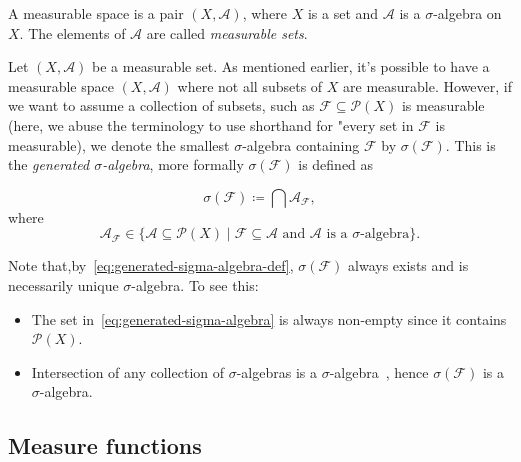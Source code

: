 \begin{definition}
    A measurable space is a pair $(X, \mathcal{A})$, where $X$ is a set and $\mathcal{A}$ is a $\sigma$-algebra on $X$. The elements of $\mathcal{A}$ are called \emph{measurable sets}.
\end{definition}

Let $(X, \mathcal{A})$ be a measurable set. As mentioned earlier, it's possible to have a measurable space $(X, \mathcal{A})$ where not all subsets of $X$ are measurable. However, if we want to assume a collection of subsets, such as $\mathcal{F} \subseteq \mathcal{P}(X)$ is measurable (here, we abuse the terminology to use shorthand for "every set in $\mathcal{F}$ is measurable), we denote the smallest $\sigma$-algebra containing $\mathcal{F}$ by $\sigma(\mathcal{F}) $. This is the \emph{generated $\sigma$-algebra}, more formally $\sigma(\mathcal{F})$ is defined as

\begin{equation}
    \sigma(\mathcal{F}) \coloneq \bigcap \mathcal{A}_\mathcal{F},\label{eq:generated-sigma-algebra-def}
\end{equation}
where
\begin{equation}
    \mathcal{A}_{\mathcal{F}}
    \in \{\mathcal{A} \subseteq  \mathcal{P}(X) \mid \mathcal{F} \subseteq \mathcal{A} \text{ and } \mathcal{A} \text{ is a } \sigma\text{-algebra} \}.\label{eq:generated-sigma-algebra}
\end{equation}

\begin{remarknl}
    Note that,by~\ref{eq:generated-sigma-algebra-def}, $\sigma(\mathcal{F})$ always exists and is necessarily unique $\sigma$-algebra. To see this:
    \begin{itemize}
        \item The set in~\ref{eq:generated-sigma-algebra} is always non-empty since it contains $\mathcal{P}(X)$.
        \item Intersection of any collection of $\sigma$-algebras is a $\sigma$-algebra~\cite[Prop 1.1.2]{MeasureTheoryCohn}, hence $\sigma(\mathcal{F})$ is a $\sigma$-algebra.
    \end{itemize}
\end{remarknl}

\subsection{Measure functions}\label{subsec:measure-functions}

